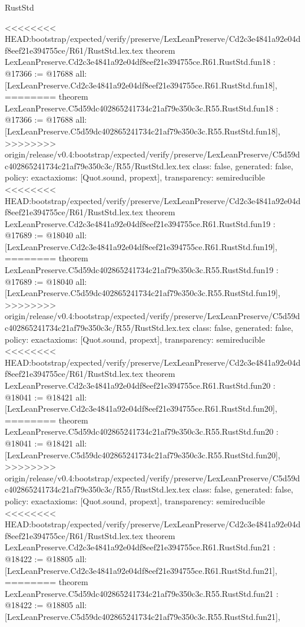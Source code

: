 \begin{lexlean}{RustStd}
\begin{coremodule}
{\begin{coremodule}
{{{{{{{{{{{{{{{{{{{{{}
<<<<<<<< HEAD:bootstrap/expected/verify/preserve/LexLeanPreserve/Cd2c3e4841a92e04df8eef21e394755ce/R61/RustStd.lex.tex
theorem LexLeanPreserve.Cd2c3e4841a92e04df8eef21e394755ce.R61.RustStd.fun18 : @17366 := @17688 {
  all: [LexLeanPreserve.Cd2c3e4841a92e04df8eef21e394755ce.R61.RustStd.fun18],
========
theorem LexLeanPreserve.C5d59dc402865241734c21af79e350c3c.R55.RustStd.fun18 : @17366 := @17688 {
  all: [LexLeanPreserve.C5d59dc402865241734c21af79e350c3c.R55.RustStd.fun18],
>>>>>>>> origin/release/v0.4:bootstrap/expected/verify/preserve/LexLeanPreserve/C5d59dc402865241734c21af79e350c3c/R55/RustStd.lex.tex
  class: false,
  generated: false,
  policy: exact{axioms: [Quot.sound, propext]},
  transparency: semireducible
}
<<<<<<<< HEAD:bootstrap/expected/verify/preserve/LexLeanPreserve/Cd2c3e4841a92e04df8eef21e394755ce/R61/RustStd.lex.tex
theorem LexLeanPreserve.Cd2c3e4841a92e04df8eef21e394755ce.R61.RustStd.fun19 : @17689 := @18040 {
  all: [LexLeanPreserve.Cd2c3e4841a92e04df8eef21e394755ce.R61.RustStd.fun19],
========
theorem LexLeanPreserve.C5d59dc402865241734c21af79e350c3c.R55.RustStd.fun19 : @17689 := @18040 {
  all: [LexLeanPreserve.C5d59dc402865241734c21af79e350c3c.R55.RustStd.fun19],
>>>>>>>> origin/release/v0.4:bootstrap/expected/verify/preserve/LexLeanPreserve/C5d59dc402865241734c21af79e350c3c/R55/RustStd.lex.tex
  class: false,
  generated: false,
  policy: exact{axioms: [Quot.sound, propext]},
  transparency: semireducible
}
<<<<<<<< HEAD:bootstrap/expected/verify/preserve/LexLeanPreserve/Cd2c3e4841a92e04df8eef21e394755ce/R61/RustStd.lex.tex
theorem LexLeanPreserve.Cd2c3e4841a92e04df8eef21e394755ce.R61.RustStd.fun20 : @18041 := @18421 {
  all: [LexLeanPreserve.Cd2c3e4841a92e04df8eef21e394755ce.R61.RustStd.fun20],
========
theorem LexLeanPreserve.C5d59dc402865241734c21af79e350c3c.R55.RustStd.fun20 : @18041 := @18421 {
  all: [LexLeanPreserve.C5d59dc402865241734c21af79e350c3c.R55.RustStd.fun20],
>>>>>>>> origin/release/v0.4:bootstrap/expected/verify/preserve/LexLeanPreserve/C5d59dc402865241734c21af79e350c3c/R55/RustStd.lex.tex
  class: false,
  generated: false,
  policy: exact{axioms: [Quot.sound, propext]},
  transparency: semireducible
}
<<<<<<<< HEAD:bootstrap/expected/verify/preserve/LexLeanPreserve/Cd2c3e4841a92e04df8eef21e394755ce/R61/RustStd.lex.tex
theorem LexLeanPreserve.Cd2c3e4841a92e04df8eef21e394755ce.R61.RustStd.fun21 : @18422 := @18805 {
  all: [LexLeanPreserve.Cd2c3e4841a92e04df8eef21e394755ce.R61.RustStd.fun21],
========
theorem LexLeanPreserve.C5d59dc402865241734c21af79e350c3c.R55.RustStd.fun21 : @18422 := @18805 {
  all: [LexLeanPreserve.C5d59dc402865241734c21af79e350c3c.R55.RustStd.fun21],
}}}}}}}}}}}}}}}}}}}}}}}}}
\end{coremodule}}
\end{coremodule}
\end{lexlean}
